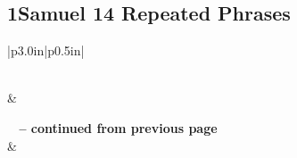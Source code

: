 \subsection{1Samuel 14 Repeated Phrases}


\normalsize
 
\begin{center}
\begin{longtable}{|p{3.0in}|p{0.5in}|}
\caption[1Samuel 14 Repeated Phrases]{1Samuel 14 Repeated Phrases}\label{table:Repeated Phrases 1Samuel 14} \\
\hline {} &  \\ \hline 
\endfirsthead
 
{{\bfseries \tablename\ \thetable{} -- continued from previous page}} \\  
\hline {} &  \\ \hline 
\endhead
 

\end{longtable}
\end{center}
